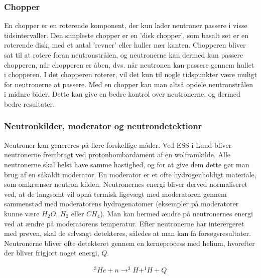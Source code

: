 \documentclass[12pt,oneside,a4paper]{article}
\begin{document}
{{{{{\subsubsection{Chopper}
En chopper er en roterende komponent, der kun lader neutroner passere i visse tidsintervaller. Den simpleste chopper er en 'disk chopper', som basalt set er en roterende disk, med et antal 'revner' eller huller nær kanten. Chopperen bliver sat til at rotere foran neutronstrålen, og neutronerne kan dermed kun passere chopperen, når chopperen er åben, dvs. når neutronen kan passere gennem hullet i chopperen. I det chopperen roterer, vil det kun til nogle tidspunkter være muligt for neutronerne at passere. Med en chopper kan man altså opdele neutronstrålen i midnre bider. Dette kan give en bedre kontrol over neutronerne, og dermed bedre resultater. \cite{ess_folder}

\subsubsection{Neutronkilder, moderator og neutrondetektionr}
Neutroner kan genereres på flere forskellige måder. Ved ESS i Lund bliver neutronerne frembragt ved protonbombardament af en wolframkilde. Alle neutronerne skal helst have samme hastighed, og for at give dem dette gør man brug af en såkaldt moderator. En moderator er et ofte hydrogenholdigt materiale, som omkrænser neutron kilden. Neutronernes energi bliver derved normaliseret ved, at de langsomt vil opnå termisk ligevægt med moderatoren gennem sammenstød med moderatorens hydrogenatomer (eksempler på moderatorer kunne være $H_2O$, $H_2$ eller $CH_4$). Man kan hermed ændre på neutronernes energi ved at ændre på moderatorens temperatur. 
Efter neutronerne har interergeret med prøven, skal de selvsagt detekteres, således at man kan få forsøgsresultater. Neutronerne 
bliver ofte detekteret gennem en kerneprocess med helium, hvorefter der bliver frigjort noget energi, $Q$. \cite{lefmann_arleth_kirkensgaard_lebech_thomsen}

\begin{align}
^3He + n \to  ^3H + ^1H + Q
\end{align}

}}}}}
\end{document}
